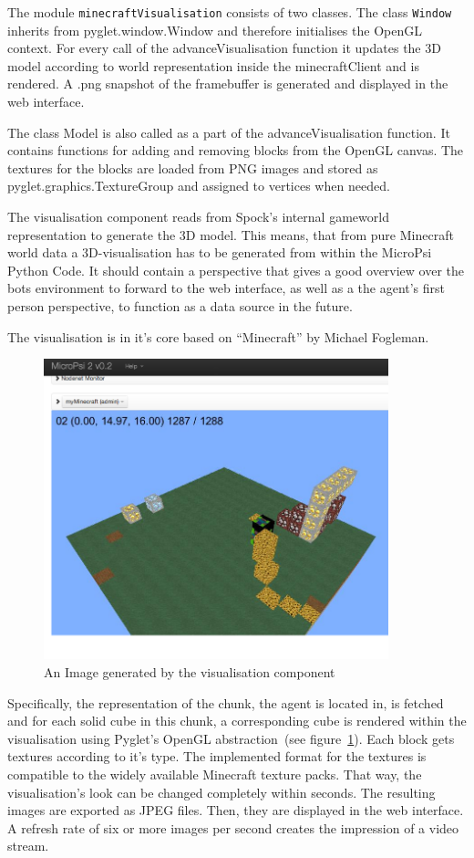 The module \texttt{minecraftVisualisation} consists of two classes. The class \texttt{Window} inherits from pyglet.window.Window and therefore initialises the OpenGL context. For every call of the advanceVisualisation function it updates the 3D model according to world representation inside the minecraftClient and is rendered. A .png snapshot of the framebuffer is generated and displayed in the web interface.

The class Model is also called as a part of the advanceVisualisation function. It contains functions for adding and removing blocks from the OpenGL canvas. The textures for the blocks are loaded from PNG images and stored as pyglet.graphics.TextureGroup and assigned to vertices when needed.

The visualisation component reads from Spock's internal gameworld representation to generate the 3D model. This means, that from pure Minecraft world data a 3D-visualisation has to be generated from within the MicroPsi Python Code. It should contain a perspective that gives a good overview over the bots environment to forward to the web interface, as well as a the agent's first person perspective, to function as a data source in the future.  

The visualisation is in it's core based on ``Minecraft'' by Michael Fogleman.

\begin{figure}[h]
  \centering
    \includegraphics[width=10cm]{graphics/visualisation_screen}
  \caption{An Image generated by the visualisation component}
  \label{vis_screen}
\end{figure}

Specifically, the representation of the chunk, the agent is located in, is fetched and for each solid cube in this chunk, a corresponding cube is rendered within the visualisation using Pyglet's OpenGL abstraction~(see figure~\ref{vis_screen}). Each block gets textures according to it's type. The implemented format for the textures is compatible to the widely available Minecraft texture packs. That way, the visualisation's look can be changed completely within seconds. The resulting images are exported as JPEG files. Then, they are displayed in the web interface. A refresh rate of six or more images per second creates the impression of a video stream.

